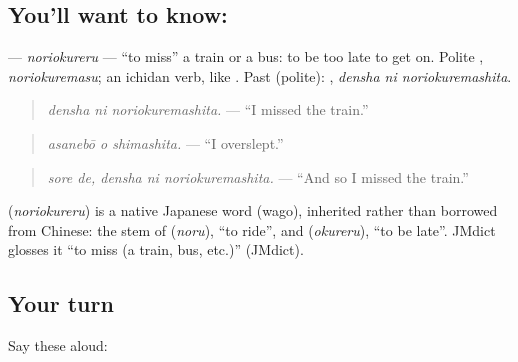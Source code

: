 \subsection*{You'll want to know: }
\textbf{} — \emph{noriokureru} — \textquotedblleft{}to miss\textquotedblright{} a train or a bus: to be too late to get on. Polite \textbf{}, \emph{noriokuremasu}; an ichidan verb, like \textbf{}. Past (polite): \textbf{ }, \emph{densha ni noriokuremashita}.

\begin{quote}
\textbf{ }
\end{quote}

\begin{quote}
\emph{densha ni noriokuremashita.} — \textquotedblleft{}I missed the train.\textquotedblright{}
\end{quote}

\begin{quote}
\textbf{ }
\end{quote}

\begin{quote}
\emph{asanebō o shimashita.} — \textquotedblleft{}I overslept.\textquotedblright{}
\end{quote}

\begin{quote}
\textbf{ }
\end{quote}

\begin{quote}
\emph{sore de, densha ni noriokuremashita.} — \textquotedblleft{}And so I missed the train.\textquotedblright{}
\end{quote}

\begin{cousinweb}
\textbf{} (\emph{noriokureru}) is a native Japanese word (wago), inherited rather than borrowed from Chinese: the stem of \textbf{} (\emph{noru}), \textquotedblleft{}to ride\textquotedblright{}, and \textbf{} (\emph{okureru}), \textquotedblleft{}to be late\textquotedblright{}. JMdict glosses it \textquotedblleft{}to miss (a train, bus, etc.)\textquotedblright{} (JMdict).
\end{cousinweb}

\subsection*{Your turn}
Say these aloud:

